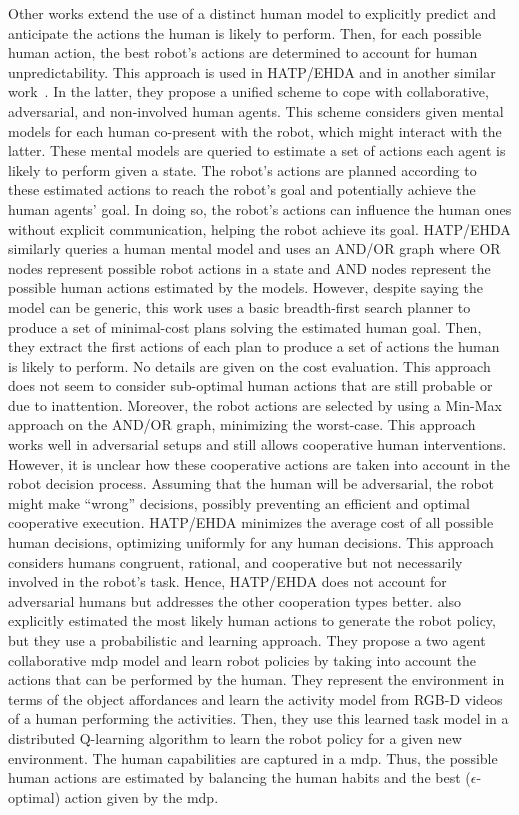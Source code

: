 Other works extend the use of a distinct human model to explicitly predict and anticipate the actions the human is likely to perform. Then, for each possible human action, the best robot's actions are determined to account for human unpredictability. This approach is used in HATP/EHDA and in another similar work~\cite{buckingham_robot_2020}. In the latter, they propose a unified scheme to cope with collaborative, adversarial, and non-involved human agents. This scheme considers given mental models for each human co-present with the robot, which might interact with the latter. These mental models are queried to estimate a set of actions each agent is likely to perform given a state. The robot's actions are planned according to these estimated actions to reach the robot's goal and potentially achieve the human agents' goal. In doing so, the robot's actions can influence the human ones without explicit communication, helping the robot achieve its goal. HATP/EHDA similarly queries a human mental model and uses an AND/OR graph where OR nodes represent possible robot actions in a state and AND nodes represent the possible human actions estimated by the models. However, despite saying the model can be generic, this work uses a basic breadth-first search planner to produce a set of minimal-cost plans solving the estimated human goal. Then, they extract the first actions of each plan to produce a set of actions the human is likely to perform. No details are given on the cost evaluation. This approach does not seem to consider sub-optimal human actions that are still probable or due to inattention. Moreover, the robot actions are selected by using a Min-Max approach on the AND/OR graph, minimizing the worst-case. This approach works well in adversarial setups and still allows cooperative human interventions. However, it is unclear how these cooperative actions are taken into account in the robot decision process. Assuming that the human will be adversarial, the robot might make ``wrong'' decisions, possibly preventing an efficient and optimal cooperative execution. HATP/EHDA minimizes the average cost of all possible human decisions, optimizing uniformly for any human decisions. This approach considers humans congruent, rational, and cooperative but not necessarily involved in the robot's task. Hence, HATP/EHDA does not account for adversarial humans but addresses the other cooperation types better.
\cite{koppula2016anticipatory} also explicitly estimated the most likely human actions to generate the robot policy, but they use a probabilistic and learning approach. They propose a two agent collaborative \acrshort{mdp} model and learn robot policies by taking into account the actions that can be performed by the human. They represent the environment in terms of the object affordances and learn the activity model from RGB-D videos of a human performing the activities. Then, they use this learned task model in a distributed Q-learning algorithm to learn the robot policy for a given new environment. 
The human capabilities are captured in a \acrshort{mdp}. Thus, the possible human actions are estimated by balancing the human habits and the best ($\epsilon$-optimal) action given by the \acrshort{mdp}. 


